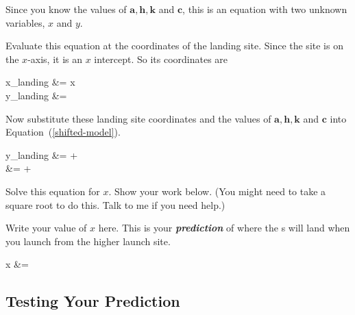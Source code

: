 Since you know the values of $\bm{a}, \bm{h}, \bm{k}$ and $\bm{c}$,
this is an equation with two unknown variables, 
$x$ and $y$.

Evaluate this equation at the coordinates of the landing site.
Since the site is on the $x$-axis, 
it is an $x$ intercept. 
So its coordinates are 
\begin{tcolorbox}[colback=\myFillinColor,ams align]
    x_{landing} &= x \\
    y_{landing} &= 
\end{tcolorbox}

Now substitute these landing site coordinates 
and the values of $\bm{a}, \bm{h}, \bm{k}$ and $\bm{c}$
into Equation~(\ref{shifted-model}).

\begin{tcolorbox}[colback=\myFillinColor,ams align]
    y_{landing} &=  +  \\
     &= 
        + 
\end{tcolorbox}

Solve this equation for $x$.
Show your work below.
(You might need to take a square root to do this. Talk to me if you need help.)
\begin{tcolorbox}[colback=\myFillinColor]
    \vspace{1.25in}
\end{tcolorbox}
\begin{tcolorbox}[colback=\myFillinColor]
    \vspace{2in}
\end{tcolorbox}

Write your value of $x$ here. 
This is your {\bfseries\itshape prediction} of where the \mymm{}s will land 
when you launch from the higher launch site.

\begin{tcolorbox}[colback=\myFillinColor,ams align]
    x &= 
\end{tcolorbox}





\subsection{Testing Your Prediction}
